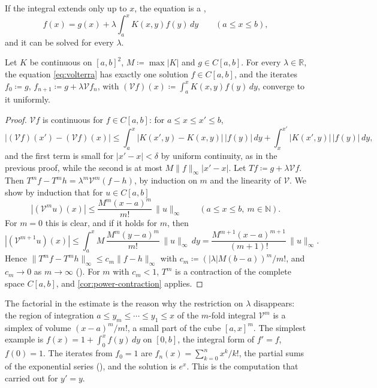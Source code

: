 If the integral extends only up to $x$, the equation is a ,
\begin{equation}
f(x)=g(x)+\lambda\int_a^xK(x,y)f(y)\,dy\qquad(a\le x\le b),
\label{eq:volterra}
\end{equation}
and it can be solved for every $\lambda$.

\begin{theorem}
\label{thm:volterra}
Let $K$ be continuous on $[a,b]^2$, $M\coloneqq\max|K|$ and $g\in C[a,b]$. For every $\lambda\in\mathbb R$, the equation \eqref{eq:volterra} has exactly one solution $f\in C[a,b]$, and the iterates $f_0\coloneqq g$, $f_{n+1}\coloneqq g+\lambda\mathcal Vf_n$, with $(\mathcal Vf)(x)\coloneqq\int_a^xK(x,y)f(y)\,dy$, converge to it uniformly.
\end{theorem}

\begin{proof}
$\mathcal Vf$ is continuous for $f\in C[a,b]$: for $a\le x\le x'\le b$,
\[
|(\mathcal Vf)(x')-(\mathcal Vf)(x)|\le\int_a^x|K(x',y)-K(x,y)|\,|f(y)|\,dy+\int_x^{x'}|K(x',y)|\,|f(y)|\,dy ,
\]
and the first term is small for $|x'-x|<\delta$ by uniform continuity, as in the previous proof, while the second is at most $M\|f\|_\infty|x'-x|$. Let $Tf\coloneqq g+\lambda\mathcal Vf$. Then $T^mf-T^mh=\lambda^m\mathcal V^m(f-h)$, by induction on $m$ and the linearity of $\mathcal V$. We show by induction that for $u\in C[a,b]$
\[
|(\mathcal V^mu)(x)|\le\frac{M^m(x-a)^m}{m!}\,\|u\|_\infty\qquad(a\le x\le b,\ m\in\mathbb N).
\]
For $m=0$ this is clear, and if it holds for $m$, then
\[
|(\mathcal V^{m+1}u)(x)|\le\int_a^xM\,\frac{M^m(y-a)^m}{m!}\,\|u\|_\infty\,dy=\frac{M^{m+1}(x-a)^{m+1}}{(m+1)!}\,\|u\|_\infty .
\]
Hence $\|T^mf-T^mh\|_\infty\le c_m\|f-h\|_\infty$ with $c_m\coloneqq(|\lambda|M(b-a))^m/m!$, and $c_m\to0$ as $m\to\infty$ (). For $m$ with $c_m<1$, $T^m$ is a contraction of the complete space $C[a,b]$, and \cref{cor:power-contraction} applies.
\end{proof}

The factorial in the estimate is the reason why the restriction on $\lambda$ disappears: the region of integration $a\le y_m\le\cdots\le y_1\le x$ of the $m$-fold integral $\mathcal V^m$ is a simplex of volume $(x-a)^m/m!$, a small part of the cube $[a,x]^m$. The simplest example is $f(x)=1+\int_0^xf(y)\,dy$ on $[0,b]$, the integral form of $f'=f$, $f(0)=1$. The iterates from $f_0=1$ are $f_n(x)=\sum_{k=0}^nx^k/k!$, the partial sums of the exponential series (), and the solution is $e^x$. This is the computation that  carried out for $y'=y$.

